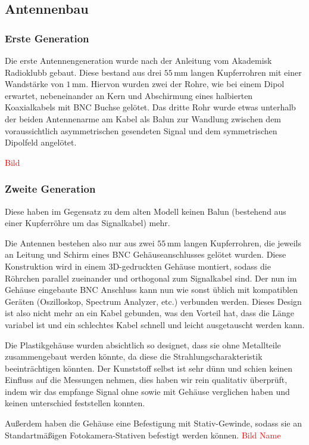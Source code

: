 \documentclass[titlepage,11pt,a4paper,ngerman]{article}
\begin{document}
\subsection{Antennenbau}
\subsubsection{Erste Generation}
Die erste Antennengeneration wurde nach der Anleitung vom Akademisk Radioklubb gebaut. Diese bestand aus drei $55\,$mm langen Kupferrohren mit einer Wandstärke von $1\,$mm. Hiervon wurden zwei der Rohre, wie bei einem Dipol erwartet, nebeneinander an Kern und Abschirmung eines halbierten Koaxialkabels mit BNC Buchse gelötet. Das dritte Rohr wurde etwas unterhalb der beiden Antennenarme am Kabel als Balun zur Wandlung zwischen dem voraussichtlich asymmetrischen gesendeten Signal und dem symmetrischen Dipolfeld angelötet.

\textcolor{red}{Bild}

\subsubsection{Zweite Generation}

 Diese haben im Gegensatz zu dem alten Modell keinen Balun (bestehend aus einer Kupferröhre um das Signalkabel) mehr.\par
Die Antennen bestehen also nur aus zwei $55\,$mm langen Kupferrohren, die jeweils an Leitung und Schirm eines BNC Gehäuseanschlusses gelötet wurden. Diese Konstruktion wird in einem 3D-gedruckten Gehäuse montiert, sodass die Röhrchen parallel zueinander und orthogonal zum Signalkabel sind. Der nun im Gehäuse eingebaute BNC Anschluss kann nun wie sonst üblich mit kompatiblen Geräten (Oszilloskop, Spectrum Analyzer, etc.) verbunden werden. Dieses Design ist also nicht mehr an ein Kabel gebunden, was den Vorteil hat, dass die Länge variabel ist und ein schlechtes Kabel schnell und leicht ausgetauscht werden kann.\par
Die Plastikgehäuse wurden absichtlich so designet, dass sie ohne Metallteile zusammengebaut werden könnte, da diese die Strahlungscharakteristik beeinträchtigen könnten. Der Kunststoff selbst ist sehr dünn und schien keinen Einfluss auf die Messungen nehmen, dies haben wir rein qualitativ überprüft, indem wir das empfange Signal ohne sowie mit Gehäuse verglichen haben und keinen unterschied feststellen konnten.\par
Außerdem haben die Gehäuse eine Befestigung mit Stativ-Gewinde, sodass sie an Standartmäßigen Fotokamera-Stativen befestigt werden können.
\textcolor{red}{Bild Name}
\end{document}
